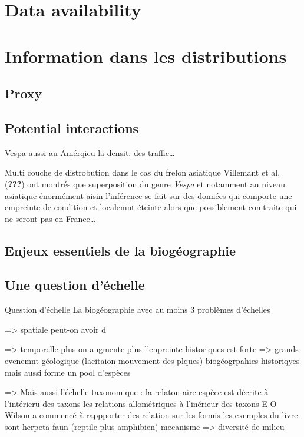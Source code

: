 \section{Data availability}\label{data-availability}

\section{Information dans les
distributions}\label{information-dans-les-distributions}

\subsection{Proxy}\label{proxy}

\subsection{Potential interactions}\label{potential-interactions}

Vespa aussi au Amérqieu la densit. des traffic\ldots{}

Multi couche de distrobution dans le cas du frelon asiatique Villemant
et al. ({\textbf{???}}) ont montrés que superposition du genre
\emph{Vespa} et notamment au niveau asiatique énormément aisin
l'inférence se fait sur des données qui comporte une empreinte de
condition et localemnt éteinte alors que possiblement comtraite qui ne
seront pas en France\ldots{}

\subsection{Enjeux essentiels de la
biogéographie}\label{enjeux-essentiels-de-la-bioguxe9ographie}

\subsection{Une question d'échelle}\label{une-question-duxe9chelle}

Question d'échelle La biogéographie avec au moins 3 problèmes d'échelles

=\textgreater{} spatiale peut-on avoir d

=\textgreater{} temporelle plus on augmente plus l'enpreinte historiques
est forte =\textgreater{} grands evenemnt géologique (lacitaion
mouvement des plques) biogéogrpahies historiqyes mais aussi forme un
pool d'espèces

=\textgreater{} Mais aussi l'échelle taxonomique : la relaton aire
espèce est décrite à l'intérieru des taxons les relations allométriques
à l'inérieur des taxons E O Wilson a commencé à rappporter des relation
sur les formis les exemples du livre sont herpeta faun (reptile plus
amphibien) mecanisme =\textgreater{} diversité de milieu

